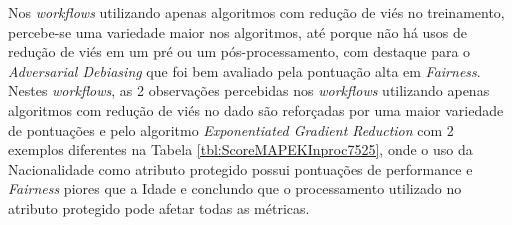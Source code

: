 \documentclass[portugues]{ic-tese}
\begin{document}
Nos \textit{workflows} utilizando apenas algoritmos com redução de viés no treinamento, percebe-se uma variedade maior nos algoritmos, até porque não há usos de redução de viés em um pré ou um pós-processamento, com destaque para o \textit{Adversarial Debiasing} que foi bem avaliado pela pontuação alta em \textit{Fairness}. Nestes \textit{workflows}, as 2 observações percebidas nos \textit{workflows} utilizando apenas algoritmos com redução de viés no dado são reforçadas por uma maior variedade de pontuações e pelo algoritmo \textit{Exponentiated Gradient Reduction} com 2 exemplos diferentes na Tabela \ref{tbl:ScoreMAPEKInproc7525}, onde o uso da Nacionalidade como atributo protegido possui pontuações de performance e \textit{Fairness} piores que a Idade e conclundo que o processamento utilizado no atributo protegido pode afetar todas as métricas.

\begin{table}[H]
\begin{center}
  \caption{Melhores opções escolhidas pelo modelo MAPE-K \\ Apenas com redução de viés no resultado - 50\% Performance/50\% Fairness}
\label{tbl:ScoreMAPEKPostproc5050}
\end{center}
\end{table}
\end{document}
